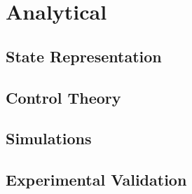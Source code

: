 
\chapter{Analytical}
\label{chap:Analytical}

\section{State Representation}
\label{sec:StateRepresentation}


\section{Control Theory}
\label{sec:ControlTheory}


\section{Simulations}
\label{sec:Simulations}

\section{Experimental Validation}
\label{sec:ExperimentalValidation}

